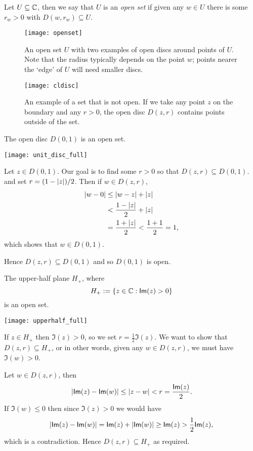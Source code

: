 \begin{definition}
Let $U \subseteq \mathbb{C}$, then we say that $U$ is an \emph{open set} if given any $w \in U$ there is some $r_w>0$ with $D(w,r_{w}) \subseteq U$.
\end{definition}
\begin{figure}[h]
\centering
\texttt{[image: openset]}
\caption{An open set $U$ with two examples of open discs around points of $U$.  Note that the radius typically depends on the point $w$; points nearer the `edge' of $U$ will need smaller discs.}
\end{figure}



\begin{figure}[h]
\centering
\texttt{[image: cldisc]}
\caption{An example of a set that is not open.  If we take any point $z$ on the boundary and any $r>0$, the open disc $D(z,r)$ contains points outside of the set.}
\label{f:discs2}
\end{figure}


\begin{example}
 The open disc $D(0,1)$ is an open set.

\texttt{[image: unit\_disc\_full]}


Let $z \in D(0,1)$.  Our goal is to find some $r>0$ so that $D(z,r) \subseteq D(0,1)$. and set $r= (1-\left| z \right|)/2$. Then if $w \in D(z,r)$,
\begin{align*}
\left| w-0 \right| & \leq \left| w-z \right| + \left| z \right| \\
& < \frac{1-\left| z \right|}{2} +\left| z \right| \\
&= \frac{1+\left| z \right|}{2} < \frac{1+1}{2} = 1,
\end{align*}
which shows that $w \in D(0,1)$.



Hence $D(z,r) \subseteq D(0,1)$ and so $D(0,1)$ is open.

\end{example}



\begin{example}
 The upper-half plane $H_+$, where
\[
H_+ := \left\{ z \in \mathbb{C}: \textsf{Im} (z) > 0 \right\}
\]
is an open set.
\begin{center}
\texttt{[image: upperhalf\_full]}
\end{center}
If $z \in H_+$ then $\Im (z)>0$, so we set $r = \frac{1}{2} \Im (z)$.  We want to show that $D(z,r)\subseteq H_+$, or in other words, given any $w \in D(z,r)$, we must have $\Im(w)>0$.

Let $w \in D(z,r)$, then
\[
\left| \textsf{Im}(z)-\textsf{Im}(w) \right| \leq \left| z-w \right| < r= \frac{\textsf{Im} (z)}{2}.
\]
If $\Im(w)\leq 0$ then since $\Im(z)>0$ we would have
\[
\left| \textsf{Im}(z)-\textsf{Im}(w) \right| = \textsf{Im}(z) + \left| \textsf{Im} (w)  \right| \geq \textsf{Im} (z) > \frac{1}{2} \textsf{Im} (z),
\]
which is a contradiction.  Hence $D(z,r) \subseteq H_+$ as required.

\end{example}



